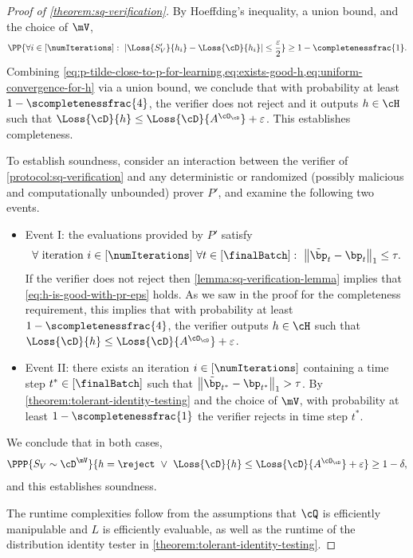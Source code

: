 \documentclass[11pt]{article}
\begin{document}
\begin{proof}[Proof of \cref{theorem:sq-verification}]
	By Hoeffding's inequality, a union bound, and the choice of $\mV$, 
	\begin{equation}\label{eq:uniform-convergence-for-h}
		\PP{\forall i \in [\numIterations]: ~ \left|\Loss{S_V'}{h_i} - \Loss{\cD}{h_i}\right| \leq \frac{\varepsilon}{2}} \geq 1-\completenessfrac{1}.
	\end{equation}
	Combining \cref{eq:p-tilde-close-to-p-for-learning,eq:exists-good-h,eq:uniform-convergence-for-h} via a union bound, we conclude that with probability at least $1-\scompletenessfrac{4}$, the verifier does not reject and it outputs $h \in \cH$ such that $\Loss{\cD}{h} \leq \Loss{\cD}{A^{\cO_\cD}} + \varepsilon$. This establishes completeness.
	
	To establish soundness, consider an interaction between the verifier of \cref{protocol:sq-verification} and any deterministic or randomized (possibly malicious and computationally unbounded) prover $P'$, and examine the following two events.
	
	\begin{itemize}
		\item{
			Event I: the evaluations provided by $P'$ satisfy 
			\begin{equation}\label{eq:p-tilde-close-to-p-for-verification}
				\forall \text{ iteration } i \in [\numIterations] ~ \forall t \in [\finalBatch]: ~  \left\|\tilde{\bp}_t  - \bp_t\right\|_1 \leq \tau.
			\end{equation}
			If the verifier does not reject then \cref{lemma:sq-verification-lemma} implies that \cref{eq:h-is-good-with-pr-eps} holds. As we saw in the proof for the completeness requirement, this implies that with probability at least $1-\scompletenessfrac{4}$, the verifier outputs $h \in \cH$ such that $\Loss{\cD}{h} \leq \Loss{\cD}{A^{\cO_\cD}} + \varepsilon$.
		
		}
		\item{
			Event II: there exists an iteration $i \in [\numIterations]$ containing a time step $t^* \in [\finalBatch]$ such that $\left\|\tilde{\bp}_{t^*}  - \bp_{t^*}\right\|_1 > \tau$. By \cref{theorem:tolerant-identity-testing} and the choice of $\mV$, with probability at least $1-\scompletenessfrac{1}$ the verifier rejects in time step $t^*$.
		}
	\end{itemize}
	We conclude that in both cases, 
	\[
		\PPP{S_V \sim \cD^{\mV}}{h = \reject ~ \lor ~ \Loss{\cD}{h} \leq \Loss{\cD}{A^{\cO_\cD}} + \varepsilon} \geq 1-\delta,
	\]
	and this establishes soundness.

	The runtime complexities follow from the assumptions that $\cQ$ is efficiently manipulable and $L$ is efficiently evaluable, as well as the runtime of the distribution identity tester in \cref{theorem:tolerant-identity-testing}.
\end{proof}
\end{document}
